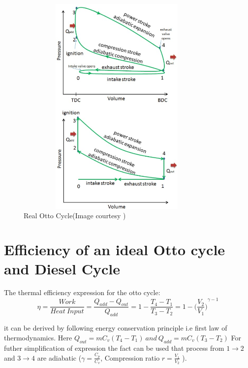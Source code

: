 \documentclass[11pt]{article}
\begin{document}
\begin{figure}[!h]
  \centering
    \vspace*{0 cm}
  \includegraphics[width=100mm, height = 110mm]{idealNreal.jpeg}
    \caption{Real Otto Cycle(Image courtesy \cite{ref16} )}
  \label{fig:Real Otto Cycle}
\end{figure}

\pagebreak

\section{Efficiency of an ideal Otto cycle and Diesel Cycle}
The thermal efficiency expression for the otto cycle:
\textbf{\[  \eta = \frac{Work}{Heat \  Input} = \frac{Q_{add}-Q_{out}}{Q_{add}} = 1 - \frac{T_4 - T_1}{T_3 - T_2} = 1- {\big(\frac{V_2}{V_1}\big)}^{\gamma -1} \]}

it can be derived by following energy conservation principle i.e first law of thermodynamics. Here $Q_{out} = m C_v (T_4 - T_1)\  and\  Q_{add} = m C_v (T_3 - T_2) $ For futher simplification of expression the fact can be used that process from $ 1\rightarrow2$ and $ 3\rightarrow4$ are adiabatic ($\gamma = \frac{C_p}{C_v}$, Compression ratio $ r = \frac{V_1}{V_2}$ ).
\end{document}
